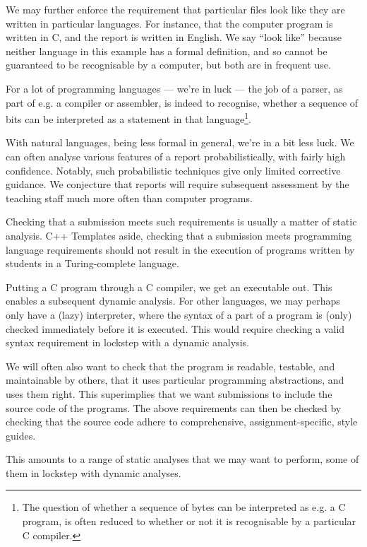 We may further enforce the requirement that particular files look like they are
written in particular languages. For instance, that the computer program is
written in C, and the report is written in English. We say ``look like''
because neither language in this example has a formal definition, and so cannot
be guaranteed to be recognisable by a computer, but both are in frequent use.

For a lot of programming languages --- we're in luck --- the job of a parser,
as part of e.g. a compiler or assembler, is indeed to recognise, whether a
sequence of bits can be interpreted as a statement in that
language\footnote{The question of whether a sequence of bytes can be
interpreted as e.g. a C program, is often reduced to whether or not it is
recognisable by a particular C compiler.}.

With natural languages, being less formal in general, we're in a bit less luck.
We can often analyse various features of a report probabilistically, with
fairly high confidence. Notably, such probabilistic techniques give only
limited corrective guidance. We conjecture that reports will require subsequent
assessment by the teaching staff much more often than computer programs.

Checking that a submission meets such requirements is usually a matter of
static analysis. C++ Templates aside\cite{veldhuizen-2003}, checking that a
submission meets programming language requirements should not result in the
execution of programs written by students in a Turing-complete language.

Putting a C program through a C compiler, we get an executable out. This
enables a subsequent dynamic analysis. For other languages, we may perhaps only
have a (lazy) interpreter, where the syntax of a part of a program is (only)
checked immediately before it is executed. This would require checking a valid
syntax requirement in lockstep with a dynamic analysis.

We will often also want to check that the program is readable, testable, and
maintainable by others, that it uses particular programming abstractions, and
uses them right. This superimplies that we want submissions to include the
source code of the programs. The above requirements can then be checked by
checking that the source code adhere to comprehensive, assignment-specific,
style guides.

This amounts to a range of static analyses that we may want to perform, some of
them in lockstep with dynamic analyses.

